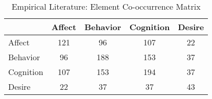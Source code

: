 \begin{wraptable}{l}{0pt}

\caption{\label{tab:EmpiricalElementCooccurrences}Empirical Literature: Element Co-occurrence Matrix}
\centering
\begin{tabular}[t]{lcccc}
\toprule
  & Affect & Behavior & Cognition & Desire\\
\midrule
Affect & 121 & 96 & 107 & 22\\
Behavior & 96 & 188 & 153 & 37\\
Cognition & 107 & 153 & 194 & 37\\
Desire & 22 & 37 & 37 & 43\\
\bottomrule
\end{tabular}
\end{wraptable}
